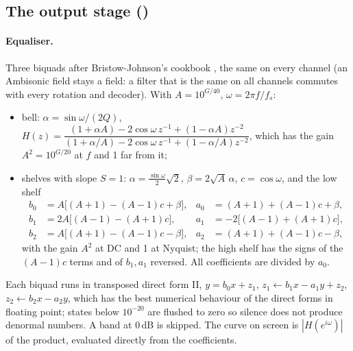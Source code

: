 \subsection{The output stage ()}
\label{sec:math-master}
\paragraph{Equaliser.} Three biquads after Bristow-Johnson's cookbook \citep{rbj}, the same on every channel (an Ambisonic
field stays a field: a filter that is the same on all channels commutes with every rotation and decoder). With
$A = 10^{G/40}$, $\omega = 2\pi f/f_s$:
\begin{itemize}[nosep]
  \item bell: $\alpha = \sin\omega/(2Q)$, $H(z) = \dfrac{(1+\alpha A) - 2\cos\omega\,z^{-1} + (1-\alpha A)z^{-2}}{(1+\alpha/A) - 2\cos\omega\,z^{-1} + (1-\alpha/A)z^{-2}}$,
    which has the gain $A^2 = 10^{G/20}$ at $f$ and 1 far from it;
  \item shelves with slope $S=1$: $\alpha = \tfrac{\sin\omega}{2}\sqrt2$, $\beta = 2\sqrt A\,\alpha$, $c = \cos\omega$, and
    the low shelf
    \begin{align*}
      b_0 &= A\bigl[(A+1)-(A-1)c+\beta\bigr], & a_0 &= (A+1)+(A-1)c+\beta,\\
      b_1 &= 2A\bigl[(A-1)-(A+1)c\bigr], & a_1 &= -2\bigl[(A-1)+(A+1)c\bigr],\\
      b_2 &= A\bigl[(A+1)-(A-1)c-\beta\bigr], & a_2 &= (A+1)+(A-1)c-\beta,
    \end{align*}
    with the gain $A^2$ at DC and 1 at Nyquist; the high shelf has the signs of the $(A-1)c$ terms and of $b_1, a_1$
    reversed. All coefficients are divided by $a_0$.
\end{itemize}
Each biquad runs in transposed direct form II,
$y = b_0x + z_1$, $z_1 \leftarrow b_1x - a_1y + z_2$, $z_2 \leftarrow b_2x - a_2y$, which has the best numerical behaviour
of the direct forms in floating point; states below $10^{-20}$ are flushed to zero so silence does not produce
denormal numbers. A band at $0$\,dB is skipped. The curve on screen is $|H(e^{i\omega})|$ of the product, evaluated
directly from the coefficients.

